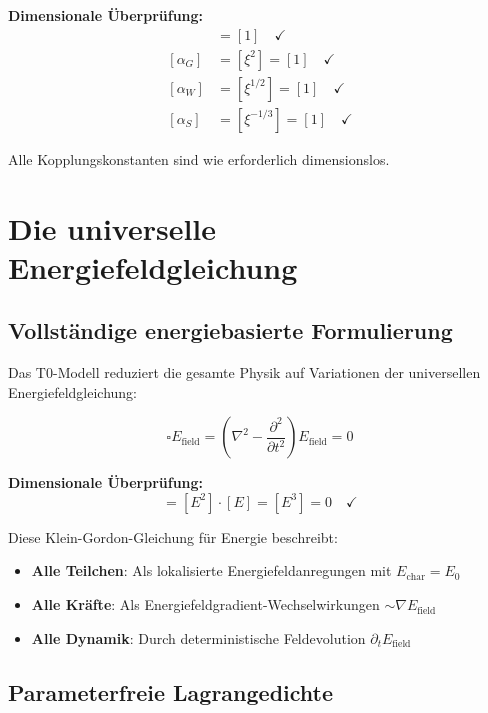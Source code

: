 \documentclass[12pt,a4paper]{report}
\begin{document}
	\textbf{Dimensionale Überprüfung:}
	\begin{align}
		[\alpha_{EM}] &= [1] \quad \checkmark \\
		[\alpha_G] &= [\xi^2] = [1] \quad \checkmark \\
		[\alpha_W] &= [\xi^{1/2}] = [1] \quad \checkmark \\
		[\alpha_S] &= [\xi^{-1/3}] = [1] \quad \checkmark
	\end{align}
	
	Alle Kopplungskonstanten sind wie erforderlich dimensionslos.
	
	\section{Die universelle Energiefeldgleichung}
	\label{sec:universal_energy_field_equation}
	
	\subsection{Vollständige energiebasierte Formulierung}
	\label{subsec:complete_energy_formulation}
	
	Das T0-Modell reduziert die gesamte Physik auf Variationen der universellen Energiefeldgleichung:
	
	\begin{equation}
		\boxed{\square E_{\text{field}} = \left(\nabla^2 - \frac{\partial^2}{\partial t^2}\right) E_{\text{field}} = 0}
		\label{eq:universal_field_equation}
	\end{equation}
	
	\textbf{Dimensionale Überprüfung:}
	\begin{equation}
		[\square E_{\text{field}}] = [E^2] \cdot [E] = [E^3] = 0 \quad \checkmark
	\end{equation}
	
	Diese Klein-Gordon-Gleichung für Energie beschreibt:
	\begin{itemize}
		\item \textbf{Alle Teilchen}: Als lokalisierte Energiefeldanregungen mit $E_{\text{char}} = E_0$
		\item \textbf{Alle Kräfte}: Als Energiefeldgradient-Wechselwirkungen $\sim \nabla E_{\text{field}}$
		\item \textbf{Alle Dynamik}: Durch deterministische Feldevolution $\partial_t E_{\text{field}}$
	\end{itemize}
	
	\subsection{Parameterfreie Lagrangedichte}
	\label{subsec:parameter_free_lagrangian}
	
\end{document}
